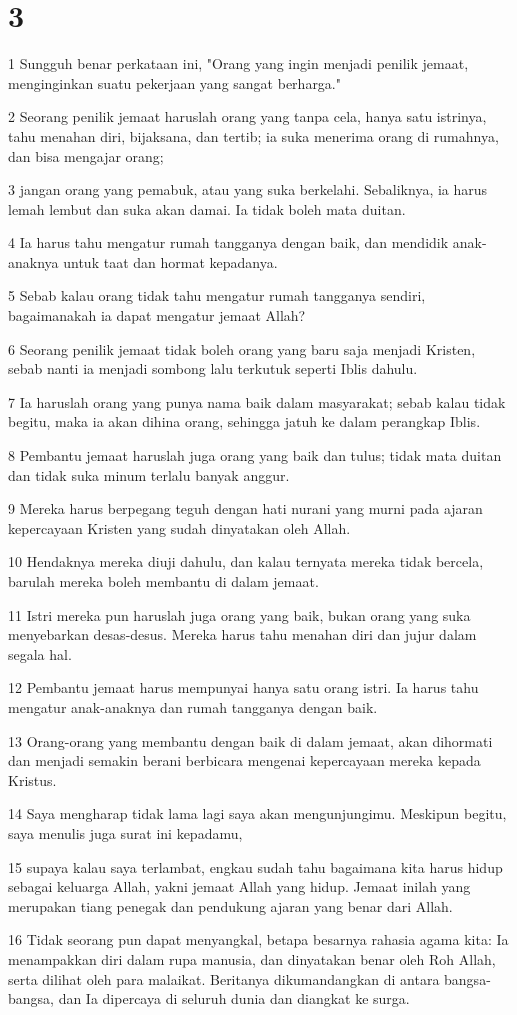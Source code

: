 \chapter{3}

\par 1 Sungguh benar perkataan ini, "Orang yang ingin menjadi penilik jemaat, menginginkan suatu pekerjaan yang sangat berharga."
\par 2 Seorang penilik jemaat haruslah orang yang tanpa cela, hanya satu istrinya, tahu menahan diri, bijaksana, dan tertib; ia suka menerima orang di rumahnya, dan bisa mengajar orang;
\par 3 jangan orang yang pemabuk, atau yang suka berkelahi. Sebaliknya, ia harus lemah lembut dan suka akan damai. Ia tidak boleh mata duitan.
\par 4 Ia harus tahu mengatur rumah tangganya dengan baik, dan mendidik anak-anaknya untuk taat dan hormat kepadanya.
\par 5 Sebab kalau orang tidak tahu mengatur rumah tangganya sendiri, bagaimanakah ia dapat mengatur jemaat Allah?
\par 6 Seorang penilik jemaat tidak boleh orang yang baru saja menjadi Kristen, sebab nanti ia menjadi sombong lalu terkutuk seperti Iblis dahulu.
\par 7 Ia haruslah orang yang punya nama baik dalam masyarakat; sebab kalau tidak begitu, maka ia akan dihina orang, sehingga jatuh ke dalam perangkap Iblis.
\par 8 Pembantu jemaat haruslah juga orang yang baik dan tulus; tidak mata duitan dan tidak suka minum terlalu banyak anggur.
\par 9 Mereka harus berpegang teguh dengan hati nurani yang murni pada ajaran kepercayaan Kristen yang sudah dinyatakan oleh Allah.
\par 10 Hendaknya mereka diuji dahulu, dan kalau ternyata mereka tidak bercela, barulah mereka boleh membantu di dalam jemaat.
\par 11 Istri mereka pun haruslah juga orang yang baik, bukan orang yang suka menyebarkan desas-desus. Mereka harus tahu menahan diri dan jujur dalam segala hal.
\par 12 Pembantu jemaat harus mempunyai hanya satu orang istri. Ia harus tahu mengatur anak-anaknya dan rumah tangganya dengan baik.
\par 13 Orang-orang yang membantu dengan baik di dalam jemaat, akan dihormati dan menjadi semakin berani berbicara mengenai kepercayaan mereka kepada Kristus.
\par 14 Saya mengharap tidak lama lagi saya akan mengunjungimu. Meskipun begitu, saya menulis juga surat ini kepadamu,
\par 15 supaya kalau saya terlambat, engkau sudah tahu bagaimana kita harus hidup sebagai keluarga Allah, yakni jemaat Allah yang hidup. Jemaat inilah yang merupakan tiang penegak dan pendukung ajaran yang benar dari Allah.
\par 16 Tidak seorang pun dapat menyangkal, betapa besarnya rahasia agama kita: Ia menampakkan diri dalam rupa manusia, dan dinyatakan benar oleh Roh Allah, serta dilihat oleh para malaikat. Beritanya dikumandangkan di antara bangsa-bangsa, dan Ia dipercaya di seluruh dunia dan diangkat ke surga.

